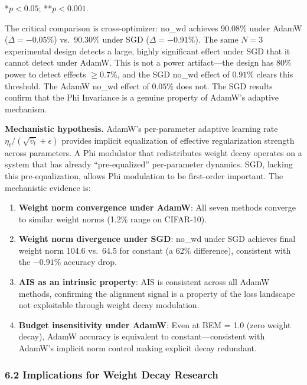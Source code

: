 \documentclass[
]{article}
\providecommand{\tightlist}{%
  \setlength{\itemsep}{0pt}\setlength{\parskip}{0pt}}
\begin{document}
*\(p < 0.05\); **\(p < 0.001\).

The critical comparison is cross-optimizer: no\_wd achieves 90.08\%
under AdamW (\(\Delta = -0.05\%\)) vs.~90.30\% under SGD
(\(\Delta = -0.91\%\)). The same \(N = 3\) experimental design detects a
large, highly significant effect under SGD that it cannot detect under
AdamW. This is not a power artifact---the design has 80\% power to
detect effects \(\geq 0.7\%\), and the SGD no\_wd effect of \(0.91\%\)
clears this threshold. The AdamW no\_wd effect of \(0.05\%\) does not.
The SGD results confirm that the Phi Invariance is a genuine property of
AdamW's adaptive mechanism.

\textbf{Mechanistic hypothesis.} AdamW's per-parameter adaptive learning
rate \(\eta_t / (\sqrt{\hat{v}_t} + \epsilon)\) provides implicit
equalization of effective regularization strength across parameters. A
Phi modulator that redistributes weight decay operates on a system that
has already ``pre-equalized'' per-parameter dynamics. SGD, lacking this
pre-equalization, allows Phi modulation to be first-order important. The
mechanistic evidence is:

\begin{enumerate}
\def\labelenumi{\arabic{enumi}.}
\tightlist
\item
  \textbf{Weight norm convergence under AdamW}: All seven methods
  converge to similar weight norms (1.2\% range on CIFAR-10).
\item
  \textbf{Weight norm divergence under SGD}: no\_wd under SGD achieves
  final weight norm 104.6 vs.~64.5 for constant (a 62\% difference),
  consistent with the \(-0.91\%\) accuracy drop.
\item
  \textbf{AIS as an intrinsic property}: AIS is consistent across all
  AdamW methods, confirming the alignment signal is a property of the
  loss landscape not exploitable through weight decay modulation.
\item
  \textbf{Budget insensitivity under AdamW}: Even at BEM = 1.0 (zero
  weight decay), AdamW accuracy is equivalent to constant---consistent
  with AdamW's implicit norm control making explicit decay redundant.
\end{enumerate}

\hypertarget{implications-for-weight-decay-research}{%
\subsubsection{6.2 Implications for Weight Decay
Research}\label{implications-for-weight-decay-research}}
\end{document}
